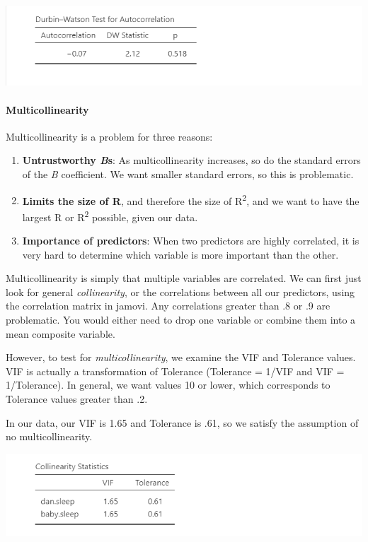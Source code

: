 \documentclass[
]{book}
\providecommand{\tightlist}{%
  \setlength{\itemsep}{0pt}\setlength{\parskip}{0pt}}
\begin{document}
\includegraphics{images/13-regression/regression-durbinwatson.png}

\hypertarget{multicollinearity}{%
\paragraph{Multicollinearity}\label{multicollinearity}}

Multicollinearity is a problem for three reasons:

\begin{enumerate}
\def\labelenumi{\arabic{enumi}.}
\tightlist
\item
  \textbf{Untrustworthy \emph{B}s}: As multicollinearity increases, so do the standard errors of the \emph{B} coefficient. We want smaller standard errors, so this is problematic.
\item
  \textbf{Limits the size of R}, and therefore the size of R\textsuperscript{2}, and we want to have the largest R or R\textsuperscript{2} possible, given our data.
\item
  \textbf{Importance of predictors}: When two predictors are highly correlated, it is very hard to determine which variable is more important than the other.
\end{enumerate}

Multicollinearity is simply that multiple variables are correlated. We can first just look for general \emph{collinearity}, or the correlations between all our predictors, using the correlation matrix in jamovi. Any correlations greater than .8 or .9 are problematic. You would either need to drop one variable or combine them into a mean composite variable.

However, to test for \emph{multicollinearity}, we examine the VIF and Tolerance values. VIF is actually a transformation of Tolerance (Tolerance = 1/VIF and VIF = 1/Tolerance). In general, we want values 10 or lower, which corresponds to Tolerance values greater than .2.

In our data, our VIF is 1.65 and Tolerance is .61, so we satisfy the assumption of no multicollinearity.

\includegraphics{images/13-regression/regression-multicollinearity.png}
\end{document}
